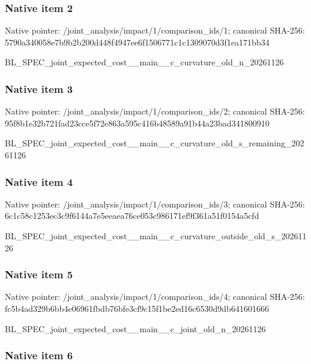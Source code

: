 \documentclass[10pt,a4paper]{article}
\begin{document}
\subsubsection{Native item 2}


Native pointer: /joint\_analysis/impact/1\allowbreak{}/comparison\_ids/1; canonical SHA-256: 5790a340058e7b9b2b200d44\allowbreak{}8f4947ee6f1506771c1c1309\allowbreak{}070d3f1ea171bb34


BL\_SPEC\_joint\_expected\_c\allowbreak{}ost\_\_main\_\_c\_curvature\_o\allowbreak{}ld\_n\_20261126


\subsubsection{Native item 3}


Native pointer: /joint\_analysis/impact/1\allowbreak{}/comparison\_ids/2; canonical SHA-256: 95f8b1e32b721fad23cce5f7\allowbreak{}2e863a595c416b48589a91b4\allowbreak{}4a23bad341800910


BL\_SPEC\_joint\_expected\_c\allowbreak{}ost\_\_main\_\_c\_curvature\_o\allowbreak{}ld\_s\_remaining\_20261126


\subsubsection{Native item 4}


Native pointer: /joint\_analysis/impact/1\allowbreak{}/comparison\_ids/3; canonical SHA-256: 6c1c58c1253ec3c9f6144a7e\allowbreak{}5eeaea76ce053c986171ef9f\allowbreak{}361a51f0154a5cfd


BL\_SPEC\_joint\_expected\_c\allowbreak{}ost\_\_main\_\_c\_curvature\_o\allowbreak{}utside\_old\_s\_20261126


\subsubsection{Native item 5}


Native pointer: /joint\_analysis/impact/1\allowbreak{}/comparison\_ids/4; canonical SHA-256: fc5b4ad329b6bb4e06961fbd\allowbreak{}b76bfe3cf9c15f1be2ed16c6\allowbreak{}530d9db641601666


BL\_SPEC\_joint\_expected\_c\allowbreak{}ost\_\_main\_\_c\_joint\_old\_n\allowbreak{}\_20261126


\subsubsection{Native item 6}
\end{document}
